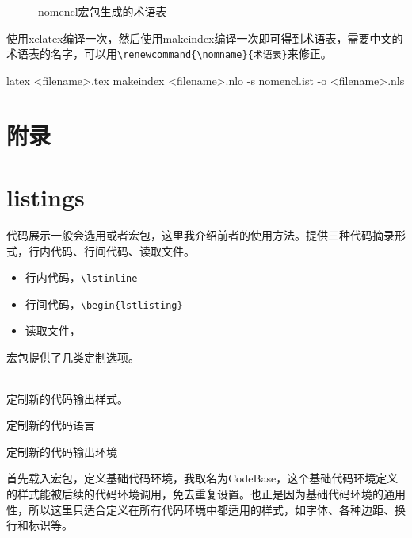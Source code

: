 

\begin{figure}[h]
    \centering
    \caption{nomencl宏包生成的术语表}
    \label{fig:tools-nomencl}
\end{figure}

使用xelatex编译一次，然后使用makeindex编译一次即可得到术语表，需要中文的术语表的名字，可以用\lstinline|\renewcommand{\nomname}{术语表}|来修正。

\begin{basiccode}
latex <filename>.tex
makeindex <filename>.nlo -s nomencl.ist -o <filename>.nls
\end{basiccode}

\section{附录}

\section{listings}

代码展示一般会选用或者宏包，这里我介绍前者的使用方法。提供三种代码摘录形式，行内代码、行间代码、读取文件。

\begin{itemize}
    \item 行内代码，\verb|\lstinline|
    \item 行间代码，\verb|\begin{lstlisting}|
    \item 读取文件，\verb||
\end{itemize}

宏包提供了几类定制选项。

\begin{table}[h]
    \begin{tabular}{ll}
        \toprule
        
        \midrule
        
        \bottomrule
    \end{tabular}
\end{table}

    定制新的代码输出样式。

    定制新的代码语言

    定制新的代码输出环境


首先载入宏包，定义基础代码环境，我取名为CodeBase，这个基础代码环境定义的样式能被后续的代码环境调用，免去重复设置。也正是因为基础代码环境的通用性，所以这里只适合定义在所有代码环境中都适用的样式，如字体、各种边距、换行和标识等。

